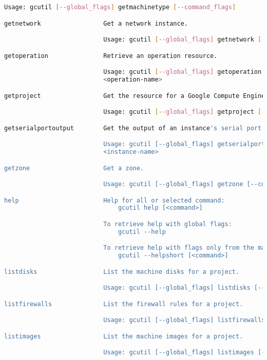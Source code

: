 \begin{lstlisting}[language=Bash]
                           Usage: gcutil [--global_flags] getmachinetype [--command_flags]

getnetwork                 Get a network instance.

                           Usage: gcutil [--global_flags] getnetwork [--command_flags] <network-name>

getoperation               Retrieve an operation resource.

                           Usage: gcutil [--global_flags] getoperation [--command_flags]
                           <operation-name>

getproject                 Get the resource for a Google Compute Engine project.

                           Usage: gcutil [--global_flags] getproject [--command_flags] <project-name>

getserialportoutput        Get the output of an instance's serial port.

                           Usage: gcutil [--global_flags] getserialportoutput [--command_flags]
                           <instance-name>

getzone                    Get a zone.

                           Usage: gcutil [--global_flags] getzone [--command_flags] <zone-name>

help                       Help for all or selected command:
                               gcutil help [<command>]

                           To retrieve help with global flags:
                               gcutil --help

                           To retrieve help with flags only from the main module:
                               gcutil --helpshort [<command>]

listdisks                  List the machine disks for a project.

                           Usage: gcutil [--global_flags] listdisks [--command_flags]

listfirewalls              List the firewall rules for a project.

                           Usage: gcutil [--global_flags] listfirewalls [--command_flags]

listimages                 List the machine images for a project.

                           Usage: gcutil [--global_flags] listimages [--command_flags]


\end{lstlisting}
